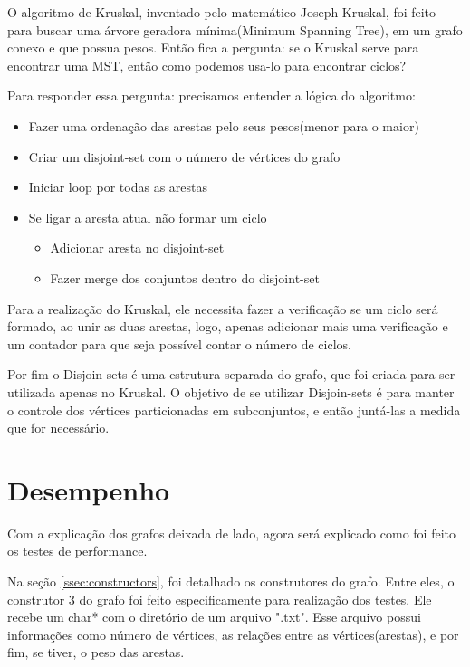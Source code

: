 \documentclass[12pt]{article}
\begin{document}
  O algoritmo de Kruskal, inventado pelo matemático Joseph Kruskal, foi feito para buscar 
  uma árvore geradora mínima(Minimum Spanning Tree), em um grafo conexo e que possua pesos. 
  Então fica a pergunta: se o Kruskal serve para encontrar uma MST, então como podemos usa-lo 
  para encontrar ciclos? 

  Para responder essa pergunta: precisamos entender a lógica do algoritmo:

  \begin{itemize}
    \item Fazer uma ordenação das arestas pelo seus pesos(menor para o maior)
    \item Criar um disjoint-set com o número de vértices do grafo 
    \item Iniciar loop por todas as arestas
    \item Se ligar a aresta atual não formar um ciclo
    
    \begin{itemize}
      \item Adicionar aresta no disjoint-set 
      \item Fazer merge dos conjuntos dentro do disjoint-set
    \end{itemize}
  \end{itemize}

  Para a realização do Kruskal, ele necessita fazer a verificação se um ciclo será formado,
  ao unir as duas arestas, logo, apenas adicionar mais uma verificação e um contador para 
  que seja possível contar o número de ciclos.

  Por fim o Disjoin-sets é uma estrutura separada do grafo, que foi criada para ser utilizada
  apenas no Kruskal. O objetivo de se utilizar Disjoin-sets é para manter o controle dos vértices 
  particionadas em subconjuntos, e então juntá-las a medida que for necessário.

  \section{Desempenho} \label{sec:performance}

  Com a explicação dos grafos deixada de lado, agora será explicado como foi feito os testes de performance.

  Na seção \ref{ssec:constructors}, foi detalhado os construtores do grafo. Entre eles,
  o construtor 3 do grafo foi feito especificamente para realização dos testes. Ele 
  recebe um char* com o diretório de um arquivo ".txt". Esse arquivo possui informações como número de 
  vértices, as relações entre as vértices(arestas), e por fim, se tiver, o peso das arestas.
\end{document}
